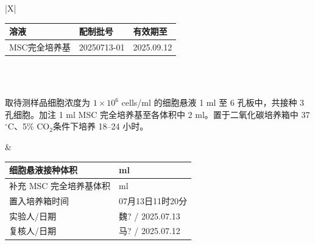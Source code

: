 \documentclass[UTF8,10pt,a4paper,fontset=fandol]{ctexart}
\newcommand{\fieldvalue}[1]{#1}
\newcommand{\handwritten}[1]{#1}
\begin{document}
\begin{center}
\begin{tabularx}{\textwidth}{|X|}
\hline
{} \\ \hline
\begin{tabularx}{\linewidth}{|X|X|X|}
\hline
溶液 & 配制批号 & 有效期至 \\ \hline
\fieldvalue{MSC完全培养基} &
\fieldvalue{\handwritten{20250713-01}} &
\fieldvalue{\handwritten{2025.09.12}}
\\ \hline
\end{tabularx}
\\ \hline
{} \\ \hline
\begin{minipage}{0.52\linewidth}
取待测样品细胞浓度为 $1\times10^{6}$ cells/ml 的细胞悬液
1 ml 至 6 孔板中，共接种 3 孔细胞。加注 1 ml MSC
完全培养基至各体积中 2 ml。置于二氧化碳培养箱中
37$^\circ$C、5\% CO$_2$条件下培养 18--24 小时。
\end{minipage}
&
\begin{tabularx}{0.48\linewidth}{|l|X|}
\hline
细胞悬液接种体积 & \hspace{1cm} ml \\ \hline
补充 MSC 完全培养基体积 & \hspace{1cm} ml \\ \hline
置入培养箱时间 &
\fieldvalue{\handwritten{07月13日11时20分}}
\\ \hline
实验人/日期 &
\fieldvalue{\handwritten{魏?}} /
\fieldvalue{\handwritten{2025.07.13}}
\\ \hline
复核人/日期 &
\fieldvalue{\handwritten{马?}} /
\fieldvalue{\handwritten{2025.07.12}}
\\ \hline
\end{tabularx}
\\ \hline
{} \\ \hline
\end{tabularx}
\end{center}
\end{document}

